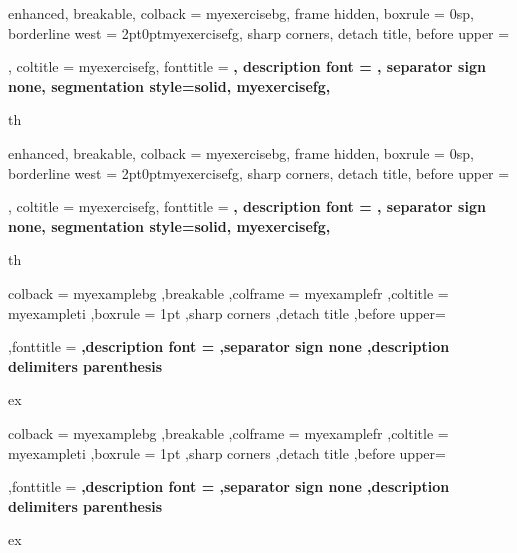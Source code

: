 
{%
	enhanced,
	breakable,
	colback = myexercisebg,
	frame hidden,
	boxrule = 0sp,
	borderline west = {2pt}{0pt}{myexercisefg},
	sharp corners,
	detach title,
	before upper = \tcbtitle\par\smallskip,
	coltitle = myexercisefg,
	fonttitle = \bfseries\sffamily,
	description font = \mdseries,
	separator sign none,
	segmentation style={solid, myexercisefg},
}
{th}

{%
	enhanced,
	breakable,
	colback = myexercisebg,
	frame hidden,
	boxrule = 0sp,
	borderline west = {2pt}{0pt}{myexercisefg},
	sharp corners,
	detach title,
	before upper = \tcbtitle\par\smallskip,
	coltitle = myexercisefg,
	fonttitle = \bfseries\sffamily,
	description font = \mdseries,
	separator sign none,
	segmentation style={solid, myexercisefg},
}
{th}


{%
	colback = myexamplebg
	,breakable
	,colframe = myexamplefr
	,coltitle = myexampleti
	,boxrule = 1pt
	,sharp corners
	,detach title
	,before upper=\tcbtitle\par\smallskip
	,fonttitle = \bfseries
	,description font = \mdseries
	,separator sign none
	,description delimiters parenthesis
}
{ex}

{%
	colback = myexamplebg
	,breakable
	,colframe = myexamplefr
	,coltitle = myexampleti
	,boxrule = 1pt
	,sharp corners
	,detach title
	,before upper=\tcbtitle\par\smallskip
	,fonttitle = \bfseries
	,description font = \mdseries
	,separator sign none
	,description delimiters parenthesis
}
{ex}


